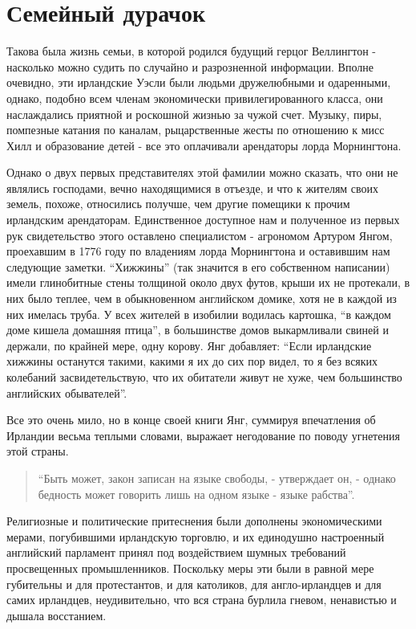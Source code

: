 \documentclass[
  oneside,
  12pt,
  titlepage]{book}
\begin{document}
\hypertarget{ux441ux435ux43cux435ux439ux43dux44bux439-ux434ux443ux440ux430ux447ux43eux43a}{%
\chapter{Семейный дурачок}\label{ux441ux435ux43cux435ux439ux43dux44bux439-ux434ux443ux440ux430ux447ux43eux43a}}

Такова была жизнь семьи, в которой родился будущий герцог Веллингтон - насколько можно судить по случайно и разрозненной информации. Вполне очевидно, эти ирландские Уэсли были людьми дружелюбными и одаренными, однако, подобно всем членам экономически привилегированного класса, они наслаждались приятной и роскошной жизнью за чужой счет. Музыку, пиры, помпезные катания по каналам, рыцарственные жесты по отношению к мисс Хилл и образование детей - все это оплачивали арендаторы лорда Морнингтона.

Однако о двух первых представителях этой фамилии можно сказать, что они не являлись господами, вечно находящимися в отъезде, и что к жителям своих земель, похоже, относились получше, чем другие помещики к прочим ирландским арендаторам. Единственное доступное нам и полученное из первых рук свидетельство этого оставлено специалистом - агрономом Артуром Янгом, проехавшим в 1776 году по владениям лорда Морнингтона и оставившим нам следующие заметки. ``Хижжины'' (так значится в его собственном написании) имели глинобитные стены толщиной около двух футов, крыши их не протекали, в них было теплее, чем в обыкновенном английском домике, хотя не в каждой из них имелась труба. У всех жителей в изобилии водилась картошка, ``в каждом доме кишела домашняя птица'', в большинстве домов выкармливали свиней и держали, по крайней мере, одну корову. Янг добавляет: ``Если ирландские хижжины останутся такими, какими я их до сих пор видел, то я без всяких колебаний засвидетельствую, что их обитатели живут не хуже, чем большинство английских обывателей''.

Все это очень мило, но в конце своей книги Янг, суммируя впечатления об Ирландии весьма теплыми словами, выражает негодование по поводу угнетения этой страны.

\begin{quote}
``Быть может, закон записан на языке свободы, - утверждает он, - однако бедность может говорить лишь на одном языке - языке рабства''.
\end{quote}

Религиозные и политические притеснения были дополнены экономическими мерами, погубившими ирландскую торговлю, и их единодушно настроенный английский парламент принял под воздействием шумных требований просвещенных промышленников. Поскольку меры эти были в равной мере губительны и для протестантов, и для католиков, для англо-ирландцев и для самих ирландцев, неудивительно, что вся страна бурлила гневом, ненавистью и дышала восстанием.
\end{document}

